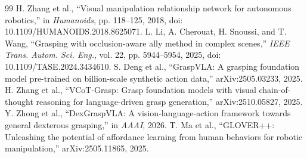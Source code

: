 \documentclass[journal]{IEEEtran}
\begin{document}
\begin{thebibliography}{99}
 H. Zhang et al., ``Visual manipulation relationship network for autonomous robotics,'' in \emph{Humanoids}, pp. 118--125, 2018, doi: 10.1109/HUMANOIDS.2018.8625071.
 L. Li, A. Cherouat, H. Snoussi, and T. Wang, ``Grasping with occlusion-aware ally method in complex scenes,'' \emph{IEEE Trans. Autom. Sci. Eng.}, vol. 22, pp. 5944--5954, 2025, doi: 10.1109/TASE.2024.3434610.
 S. Deng et al., ``GraspVLA: A grasping foundation model pre-trained on billion-scale synthetic action data,'' arXiv:2505.03233, 2025.
 H. Zhang et al., ``VCoT-Grasp: Grasp foundation models with visual chain-of-thought reasoning for language-driven grasp generation,'' arXiv:2510.05827, 2025.
 Y. Zhong et al., ``DexGraspVLA: A vision-language-action framework towards general dexterous grasping,'' in \emph{AAAI}, 2026.
 T. Ma et al., ``GLOVER++: Unleashing the potential of affordance learning from human behaviors for robotic manipulation,'' arXiv:2505.11865, 2025.
\end{thebibliography}
\end{document}
